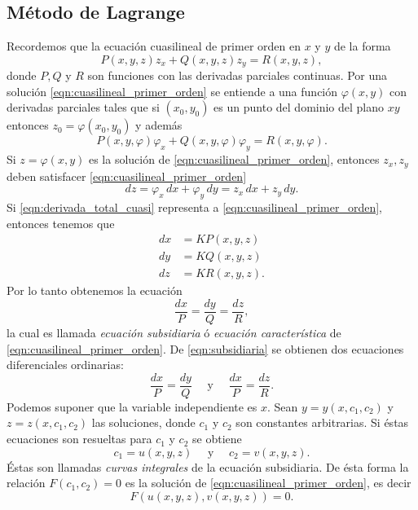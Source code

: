 \documentclass[11pt,letterpaper,draft]{report}
\newcommand\<{\langle}
\renewcommand\>{\rangle}
\renewcommand\phi\varphi
\begin{document}
\subsection{Método de Lagrange}

Recordemos que la ecuación cuasilineal de primer orden en
$x$ y $y$ de la forma
\begin{equation}
  \label{eqn:cuasilineal_primer_orden}
  P(x,y,z) z_x + Q(x,y,z) z_y = R(x,y,z),
\end{equation}
donde $P, Q$ y $R$ son funciones con las derivadas parciales
continuas. Por una solución
\ref{eqn:cuasilineal_primer_orden} se entiende a una función
$\phi(x,y)$ con derivadas parciales tales que si $(x_0,y_0)$
es un punto del dominio del plano $xy$ entonces $z_0 =
\phi(x_0,y_0)$ y además
\[
P(x,y,\phi) \phi_x + Q(x,y,\phi) \phi_y = R(x,y,\phi).
\] 
Si $z = \phi(x,y)$ es la solución de
\ref{eqn:cuasilineal_primer_orden}, entonces $z_x, z_y$
deben satisfacer \ref{eqn:cuasilineal_primer_orden}
\begin{equation}
  \label{eqn:derivada_total_cuasi}
  dz = \phi_x \, dx + \phi_y \, dy = z_x \, dx + z_y \, dy.
\end{equation}
Si \ref{eqn:derivada_total_cuasi} representa a
\ref{eqn:cuasilineal_primer_orden}, entonces tenemos que
\begin{align*}
  dx &= KP(x,y,z)\\
  dy &= KQ(x,y,z)\\
  dz &= KR(x,y,z).
\end{align*}
Por lo tanto obtenemos la ecuación
\begin{equation}
  \label{eqn:subsidiaria}
  \frac{dx}{P} = \frac{dy}{Q} = \frac{dz}{R},
\end{equation}
la cual es llamada \textit{ecuación subsidiaria} ó
\textit{ecuación característica} de
\ref{eqn:cuasilineal_primer_orden}. De \ref{eqn:subsidiaria}
se obtienen dos ecuaciones diferenciales ordinarias:
\[
\frac{dx}{P} = \frac{dy}{Q} \quad \text{ y } \quad
\frac{dx}{P} = \frac{dz}{R}.
\] 
Podemos suponer que la variable independiente es $x$. Sean
$y = y(x,c_1,c_2)$ y
$z = z(x,c_1,c_2)$ las soluciones, donde
$c_1$ y $c_2$ son constantes arbitrarias. Si éstas
ecuaciones son resueltas para $c_1$ y $c_2$ se obtiene
\[
c_1 = u(x,y,z) \quad \text{ y } \quad c_2 = v(x,y,z).
\] 
Éstas son llamadas \textit{curvas integrales} de la ecuación
subsidiaria. De ésta forma la relación $F(c_1,c_2) = 0$ es
la solución
de \ref{eqn:cuasilineal_primer_orden}, es decir
\[
F(u(x,y,z), v(x,y,z))=0.
\] 
\end{document}
